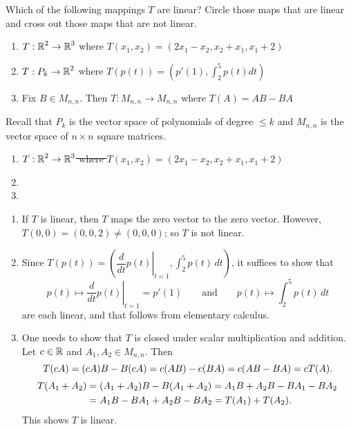 \documentclass{ximera}
\author{Matthew Carr}
\begin{document}
\begin{exercise}\label{mc.exercise3}


Which of the following mappings $T$ are linear?  Circle those maps that are linear and cross out those maps that are not linear.

\begin{enumerate}
\item $T:\mbox{$\mathbb{R}$}^2\to\mbox{$\mathbb{R}$}^3$ where $T(x_1,x_2) = (2x_1 - x_2, x_2 + x_1, x_1 + 2)$
\item $T:P_k\to\mbox{$\mathbb{R}$}^2$ where $T(p(t)) = (p'(1), \int_2^5p(t)dt)$
\item Fix $B\in M_{n,n}$. Then $T:M_{n,n}\to M_{n,n}$ where $T(A) = AB-BA$
\end{enumerate}
Recall that $P_k$ is the vector space of polynomials of degree $\leq k$ and $M_{n,n}$ is the vector space of $n\times n$ square matrices. 
 
  
\begin{solution}

\ans \begin{enumerate}
\item \sout{$T:\mbox{$\mathbb{R}$}^2\to\mbox{$\mathbb{R}$}^3$ where $T(x_1,x_2) = (2x_1 - x_2, x_2 + x_1, x_1 + 2)$}
\item {}
\item {}
\end{enumerate}


\soln  
\begin{enumerate}
\item If $T$ is linear, then $T$ maps the zero vector to the zero vector.  However, $T(0,0)=(0,0,2)\ne (0,0,0)$; so $T$ is not linear.
\item Since $T(p(t))=\left(\left.\dfrac{d}{dt}p(t)\right|_{t=1},\int_{2}^{5}p(t)\,dt\right)$, it suffices to show that 
\[
p(t)\mapsto \left.\dfrac{d}{dt}p(t)\right|_{t=1}=p'(1)\qquad\text{and}\qquad p(t)\mapsto \int_{2}^{5}p(t)\,dt
\]
are each linear, and that follows from elementary calculus. 
\item One needs to show that $T$ is closed under scalar multiplication and addition.  Let $c\in\mbox{$\mathbb{R}$}$ and $A_1,A_2\in M_{n,n}$. Then 
\[
T(cA)=(cA)B-B(cA)=c(AB)-c(BA)=c(AB-BA) = cT(A)\ldotp
\] 
\begin{align*}
T(A_1+A_2)&=(A_1+A_2)B-B(A_1+A_2)=A_1 B+A_2 B-B A_1-BA_2\\
&=A_1 B-BA_1+A_2B-BA_2=T(A_1)+T(A_2)\ldotp
\end{align*}
This shows $T$ is linear.
\end{enumerate}

\end{solution}
\end{exercise}
\end{document}
